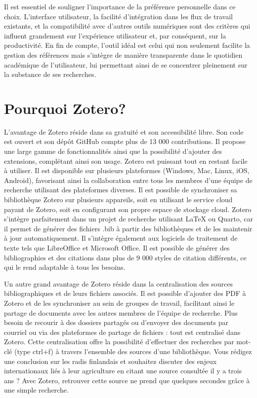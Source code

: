 \documentclass[
  letterpaper,
]{scrbook}
\begin{document}
Il est essentiel de souligner l'importance de la préférence personnelle
dans ce choix. L'interface utilisateur, la facilité d'intégration dans
les flux de travail existants, et la compatibilité avec d'autres outils
numériques sont des critères qui influent grandement sur l'expérience
utilisateur et, par conséquent, sur la productivité. En fin de compte,
l'outil idéal est celui qui non seulement facilite la gestion des
références mais s'intègre de manière transparente dans le quotidien
académique de l'utilisateur, lui permettant ainsi de se concentrer
pleinement sur la substance de ses recherches.

\hypertarget{pourquoi-zotero}{%
\section{Pourquoi Zotero?}\label{pourquoi-zotero}}

L'avantage de Zotero réside dans sa gratuité et son accessibilité libre.
Son code est ouvert et son dépôt GitHub compte plus de 13 000
contributions. Il propose une large gamme de fonctionnalités ainsi que
la possibilité d'ajouter des extensions, complétant ainsi son usage.
Zotero est puissant tout en restant facile à utiliser. Il est disponible
sur plusieurs plateformes (Windows, Mac, Linux, iOS, Android),
favorisant ainsi la collaboration entre tous les membres d'une équipe de
recherche utilisant des plateformes diverses. Il est possible de
synchroniser sa bibliothèque Zotero sur plusieurs appareils, soit en
utilisant le service cloud payant de Zotero, soit en configurant son
propre espace de stockage cloud. Zotero s'intègre parfaitement dans un
projet de recherche utilisant LaTeX ou Quarto, car il permet de générer
des fichiers .bib à partir des bibliothèques et de les maintenir à jour
automatiquement. Il s'intègre également aux logiciels de traitement de
texte tels que LibreOffice et Microsoft Office. Il est possible de
générer des bibliographies et des citations dans plus de 9 000 styles de
citation différents, ce qui le rend adaptable à tous les besoins.

Un autre grand avantage de Zotero réside dans la centralisation des
sources bibliographiques et de leurs fichiers associés. Il est possible
d'ajouter des PDF à Zotero et de les synchroniser au sein de groupes de
travail, facilitant ainsi le partage de documents avec les autres
membres de l'équipe de recherche. Plus besoin de recourir à des dossiers
partagés ou d'envoyer des documents par courriel ou via des plateformes
de partage de fichiers : tout est centralisé dans Zotero. Cette
centralisation offre la possibilité d'effectuer des recherches par
mot-clé (type ctrl+f) à travers l'ensemble des sources d'une
bibliothèque. Vous rédigez une conclusion sur les radis finlandais et
souhaitez discuter des enjeux internationaux liés à leur agriculture en
citant une source consultée il y a trois ans ? Avec Zotero, retrouver
cette source ne prend que quelques secondes grâce à une simple
recherche.
\end{document}
